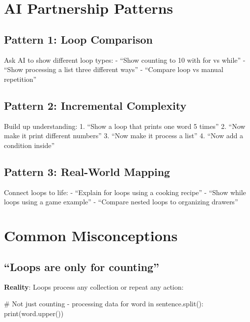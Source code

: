 \documentclass[
  letterpaper,
  DIV=11,
  numbers=noendperiod,
  oneside]{scrreprt}
\newenvironment{Shaded}{}{}
\newcommand{\BuiltInTok}[1]{\textcolor[rgb]{0.84,0.23,0.29}{#1}}
\newcommand{\CommentTok}[1]{\textcolor[rgb]{0.42,0.45,0.49}{#1}}
\newcommand{\ControlFlowTok}[1]{\textcolor[rgb]{0.84,0.23,0.29}{#1}}
\newcommand{\KeywordTok}[1]{\textcolor[rgb]{0.84,0.23,0.29}{#1}}
\newcommand{\NormalTok}[1]{\textcolor[rgb]{0.14,0.16,0.18}{#1}}
\begin{document}
\section{AI Partnership Patterns}\label{ai-partnership-patterns-4}

\subsection{Pattern 1: Loop Comparison}\label{pattern-1-loop-comparison}

Ask AI to show different loop types: - ``Show counting to 10 with for vs
while'' - ``Show processing a list three different ways'' - ``Compare
loop vs manual repetition''

\subsection{Pattern 2: Incremental
Complexity}\label{pattern-2-incremental-complexity}

Build up understanding: 1. ``Show a loop that prints one word 5 times''
2. ``Now make it print different numbers'' 3. ``Now make it process a
list'' 4. ``Now add a condition inside''

\subsection{Pattern 3: Real-World
Mapping}\label{pattern-3-real-world-mapping-1}

Connect loops to life: - ``Explain for loops using a cooking recipe'' -
``Show while loops using a game example'' - ``Compare nested loops to
organizing drawers''

\section{Common Misconceptions}\label{common-misconceptions-4}

\subsection{``Loops are only for
counting''}\label{loops-are-only-for-counting}

\textbf{Reality}: Loops process any collection or repeat any action:

\begin{Shaded}
\begin{Highlighting}[]
\CommentTok{\# Not just counting {-} processing data}
\ControlFlowTok{for}\NormalTok{ word }\KeywordTok{in}\NormalTok{ sentence.split():}
    \BuiltInTok{print}\NormalTok{(word.upper())}
\end{Highlighting}
\end{Shaded}
\end{document}
